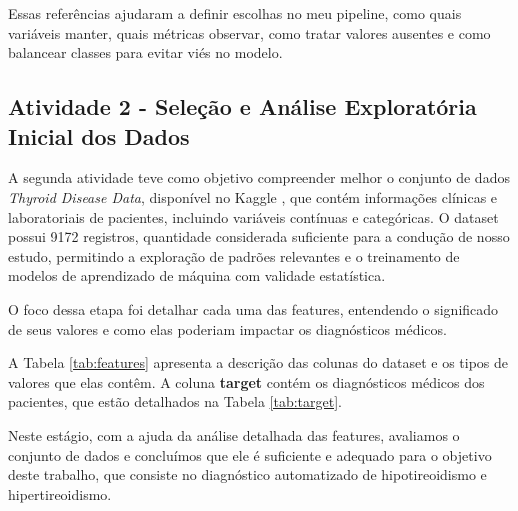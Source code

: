 \documentclass[11pt]{article}
\begin{document}
Essas referências ajudaram a definir escolhas no meu pipeline, como quais variáveis manter, quais métricas observar, como tratar valores ausentes e como balancear classes para evitar viés no modelo.

\subsection{Atividade 2 - Seleção e Análise Exploratória Inicial dos Dados}

A segunda atividade teve como objetivo compreender melhor o conjunto de dados \textit{Thyroid Disease Data}, disponível no Kaggle \cite{thyroid-dataset}, que contém informações clínicas e laboratoriais de pacientes, incluindo variáveis contínuas e categóricas. O dataset possui 9172 registros, quantidade considerada suficiente para a condução de nosso estudo, permitindo a exploração de padrões relevantes e o treinamento de modelos de aprendizado de máquina com validade estatística.


O foco dessa etapa foi detalhar cada uma das features, entendendo o significado de seus valores e como elas poderiam impactar os diagnósticos médicos. 

A Tabela \ref{tab:features} apresenta a descrição das colunas do dataset e os tipos de valores que elas contêm.
A coluna \textbf{target} contém os diagnósticos médicos dos pacientes, que estão detalhados na Tabela \ref{tab:target}.  

Neste estágio, com a ajuda da análise detalhada das features, avaliamos o conjunto de dados e concluímos que ele é suficiente e adequado para o objetivo deste trabalho, que consiste no diagnóstico automatizado de hipotireoidismo e hipertireoidismo.
\end{document}
